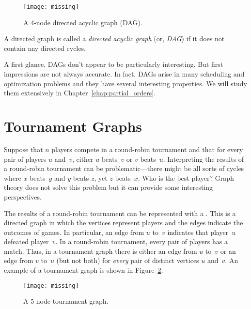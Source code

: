 \begin{figure}

\missinggraphic

\texttt{[image: missing]}

\caption{A 4-node directed acyclic graph (DAG).}

\label{fig:6ED}

\end{figure}

\begin{definition}
A directed graph is called a \emph{directed acyclic graph} (or,
\emph{DAG}) if it does not contain any directed cycles.
\end{definition}

A first glance, DAGs don't appear to be particularly interesting.  But
first impressions are not always accurate.  In fact, DAGs arise in
many scheduling and optimization problems and they have several
interesting properties.  We will study them extensively in
Chapter~\ref{chap:partial_orders}.

\section{Tournament Graphs}

Suppose that $n$ players compete in a round-robin tournament and that
for every pair of players $u$ and~$v$, either $u$ beats~$v$ or $v$
beats~$u$.  Interpreting the results of a round-robin tournament can
be problematic---there might be all sorts of cycles where $x$
beats~$y$ and $y$ beats $z$, yet $z$ beats~$x$.  Who is the best
player?  Graph theory does not solve this problem but it can provide
some interesting perspectives.

The results of a round-robin tournament can be represented with a
.  This is a directed graph in which the
vertices represent players and the edges indicate the outcomes of
games.  In particular, an edge from $u$ to~$v$ indicates that
player~$u$ defeated player~$v$.  In a round-robin tournament, every
pair of players has a match.  Thus, in a tournament graph there is
either an edge from $u$ to~$v$ or an edge from $v$ to~$u$ (but not
both) for \emph{every} pair of distinct vertices $u$ and~$v$.  An
example of a tournament graph is shown in Figure~\ref{fig:6EE1}.

\begin{figure}

\missinggraphic

\texttt{[image: missing]}

\caption{A 5-node tournament graph.}

\label{fig:6EE1}

\end{figure}

